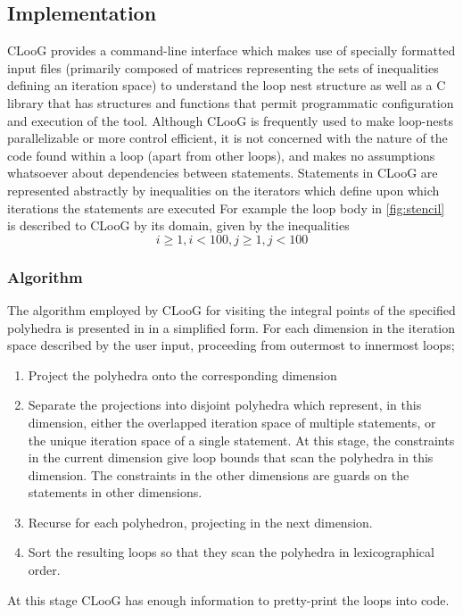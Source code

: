\documentclass[a4paper,12pt,twoside]{report}
\begin{document}
\subsection{Implementation}
CLooG provides a command-line interface which makes use of specially formatted input files (primarily composed of matrices representing
the sets of inequalities defining an iteration space) to understand the loop nest structure as well as a C library that has structures and
functions that permit programmatic configuration and execution of the tool.
Although CLooG is frequently used to make loop-nests parallelizable or more control efficient, it is not concerned with the nature of the
code found within a loop (apart from other loops), and makes no assumptions whatsoever about dependencies between statements.
Statements in CLooG are represented abstractly by inequalities on the iterators which define upon which iterations the statements are executed 
For example the loop body in \ref{fig:stencil} is described to CLooG by its domain, given by the inequalities
\[i \ge 1 , i < 100 , j \ge 1, j < 100 \]

\subsubsection{Algorithm}
The algorithm employed by CLooG for visiting the integral points of the specified polyhedra \cite{polyhedra-algo} is presented in in a simplified form.
For each dimension in the iteration space described by the user input, proceeding from outermost to innermost loops;
\begin{enumerate}
    \item Project the polyhedra onto the corresponding dimension 
    \item Separate the projections into disjoint polyhedra which represent, in this dimension, either the overlapped iteration
        space of multiple statements, or the unique iteration space of a single statement. At this stage, the constraints in the current
        dimension give loop bounds that scan the polyhedra in this dimension. The constraints in the other dimensions are guards on 
        the statements in other dimensions.
    \item Recurse for each polyhedron, projecting in the next dimension.
    \item Sort the resulting loops so that they scan the polyhedra in lexicographical order.
\end{enumerate}
At this stage CLooG has enough information to pretty-print the loops into code.
\end{document}
